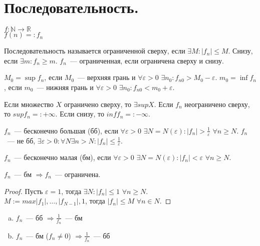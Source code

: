 \documentclass{article}
\begin{document}
	\tableofcontents
	\setcounter{tocdepth}{3}
	\newpage
	\section{Последовательность.}
	$f: \mathbb{N} \rightarrow \mathbb{R}$ \\
	$f(n) =: f_n$
	\begin{definition}
		Последовательность называется ограниченной сверху, если $\exists M: |f_n| \leqslant M$. Снизу, если $\exists m:  f_n \geqslant m$. $f_n$~--- ограниченная, если ограничена сверху и снизу.
	\end{definition}
	\begin{definition}
		$M_0 = \sup f_n$, если $M_0$~--- верхняя грань и $\forall \varepsilon > 0$ $\exists n_0: f_{n0} > M_0 - \varepsilon$. $m_0 = \inf f_n$, если $m_0$~--- нижняя грань и $\forall \varepsilon > 0$ $\exists n_0: f_{n0} < m_0 + \varepsilon$.
	\end{definition}
	\begin{axiom}
		Если множество $X$ ограничено сверху, то $\exists sup X$. Если $f_n$ неограничено сверху, то $sup f_n =: + \infty$. Если снизу, то $inf f_n =: - \infty$.
	\end{axiom}
	\begin{definition}
		$f_n$~--- бесконечно большая (бб), если $\forall \varepsilon > 0$ $\exists N = N(\varepsilon): |f_n| > \frac{1}{\varepsilon}$ $\forall n \geqslant N$. $f_n$~--- не бб, $\exists \varepsilon > 0: \forall N \exists n > N: |f_n| \leqslant \frac{1}{\varepsilon}$.
	\end{definition}
	\begin{definition}
		$f_n$~--- бесконечно малая (бм), если $\forall \varepsilon > 0$ $\exists N = N(\varepsilon): |f_n| <\varepsilon$ $\forall n \geqslant N$.
	\end{definition}
	\begin{lemma}
		$f_n$~--- бм $\Rightarrow f_n$~--- ограничена.
	\end{lemma}
	\begin{proof}
		Пусть $\varepsilon = 1$, тогда $\exists N: |f_n| \leqslant 1$ $\forall n \geqslant N$. \\
		$M := max{|f_1|, \dots, |f_{N - 1}|, 1}$, тогда $|f_n| \leqslant M$ $\forall n \in N$.
	\end{proof}
	\begin{lemma}
		\begin{enumerate}[a)]
			\item $f_n$~--- бб $\Rightarrow \frac{1}{f_n}$~--- бм
			\item $f_n$~--- бм ($f_n \not= 0$) $\Rightarrow \frac{1}{f_n}$~--- бб
		\end{enumerate}
	\end{lemma}
\end{document}
